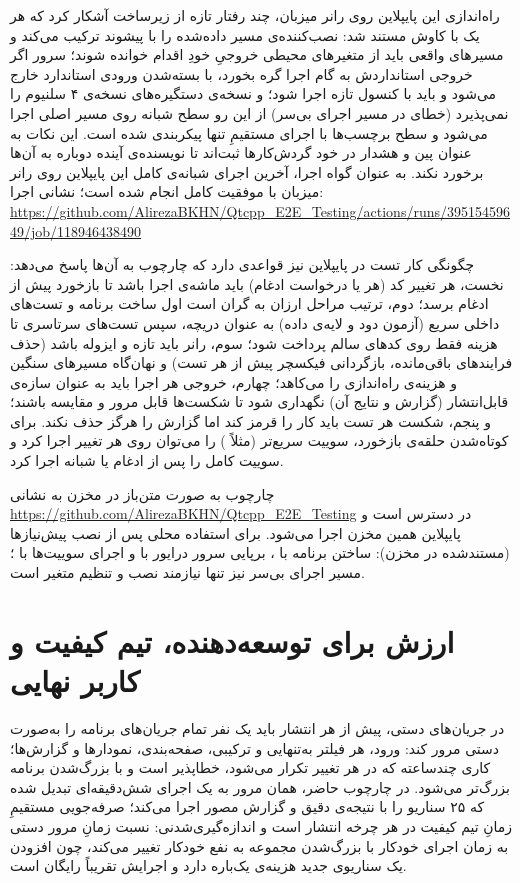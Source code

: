 راه‌اندازی این پایپلاین روی رانر میزبان، چند رفتار تازه از زیرساخت آشکار کرد که هر یک با کاوش مستند شد: نصب‌کننده‌ی
مسیر داده‌شده را با پیشوند
ترکیب می‌کند و مسیرهای واقعی باید از متغیرهای محیطی خروجیِ خودِ اقدام خوانده شوند؛ سرور
اگر خروجی استانداردش به گام اجرا گره بخورد، با بسته‌شدن ورودی استاندارد خارج می‌شود و باید با کنسول تازه اجرا شود؛ و نسخه‌ی
دستگیره‌های
نسخه‌ی ۴ سلنیوم را نمی‌پذیرد (خطای
در مسیر اجرای بی‌سر) \pdash{} از این رو سطح شبانه روی مسیر اصلی
اجرا می‌شود و سطح برچسب‌ها با اجرای مستقیمِ
تنها پیکربندی شده است. این نکات به عنوان پین و هشدار در خود گردش‌کارها ثبت‌اند تا نویسنده‌ی آینده دوباره به آن‌ها برخورد نکند. به عنوان گواه اجرا، آخرین اجرای شبانه‌ی کامل این پایپلاین روی رانر میزبان با موفقیت کامل انجام شده است؛ نشانی اجرا:
\url{https://github.com/AlirezaBKHN/Qtcpp_E2E_Testing/actions/runs/39515459649/job/118946438490}

چگونگی کار تست در پایپلاین نیز قواعدی دارد که چارچوب به آن‌ها پاسخ می‌دهد: نخست، هر تغییر کد (هر
یا درخواست ادغام) باید ماشه‌ی اجرا باشد تا بازخورد پیش از ادغام برسد؛ دوم، ترتیب مراحل ارزان به گران است \pdash{} اول ساخت برنامه و تست‌های داخلی سریع (آزمون دود و لایه‌ی داده) به عنوان دریچه، سپس تست‌های سرتاسری \pdash{} تا هزینه فقط روی کدهای سالم پرداخت شود؛ سوم، رانر باید تازه و ایزوله باشد (حذف فرایندهای باقی‌مانده، بازگردانی فیکسچر پیش از هر تست) و نهان‌گاه مسیرهای سنگین
و
هزینه‌ی راه‌اندازی را می‌کاهد؛ چهارم، خروجی هر اجرا باید به عنوان سازه‌ی قابل‌انتشار (گزارش
و نتایج آن) نگهداری شود تا شکست‌ها قابل مرور و مقایسه باشند؛ و پنجم، شکست هر تست باید کار را قرمز کند اما گزارش را هرگز حذف نکند. برای کوتاه‌شدن حلقه‌ی بازخورد، سوییت سریع‌تر (مثلاً
)
را می‌توان روی هر تغییر اجرا کرد و سوییت کامل را پس از ادغام یا شبانه اجرا کرد.

چارچوب به صورت متن‌باز در مخزن
به نشانی
\url{https://github.com/AlirezaBKHN/Qtcpp_E2E_Testing}
در دسترس است و پایپلاین همین مخزن اجرا می‌شود. برای استفاده محلی پس از نصب پیش‌نیازها (مستندشده در مخزن): ساختن برنامه با
،
برپایی سرور درایور با
و اجرای سوییت‌ها با
؛
مسیر اجرای بی‌سر نیز تنها نیازمند نصب
و تنظیم متغیر
است.

\section{ارزش برای توسعه‌دهنده، تیم کیفیت و کاربر نهایی}
در جریان‌های دستی، پیش از هر انتشار باید یک نفر تمام جریان‌های برنامه را به‌صورت دستی مرور کند: ورود، هر فیلتر به‌تنهایی و ترکیبی، صفحه‌بندی، نمودارها و گزارش‌ها؛ کاری چندساعته که در هر تغییر تکرار می‌شود، خطاپذیر است و با بزرگ‌شدن برنامه بزرگ‌تر می‌شود. در چارچوب حاضر، همان مرور به یک اجرای شش‌دقیقه‌ای تبدیل شده که ۲۵ سناریو را با نتیجه‌ی دقیق و گزارش مصور اجرا می‌کند؛ صرفه‌جویی مستقیمِ زمانِ تیم کیفیت در هر چرخه انتشار است و اندازه‌گیری‌شدنی: نسبت زمانِ مرور دستی به زمان اجرای خودکار با بزرگ‌شدن مجموعه به نفع خودکار تغییر می‌کند، چون افزودن یک سناریوی جدید هزینه‌ی یک‌باره دارد و اجرایش تقریباً رایگان است.

